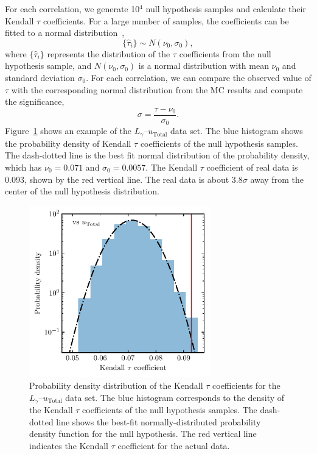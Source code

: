 \documentclass[doublespace,nopageskip]{VTthesis}
\begin{document}
For each correlation, we generate 10$^4$ null hypothesis samples and calculate their Kendall $\tau$ coefficients. For a large number of samples, the coefficients can be fitted to a normal distribution~\citep{10.2307/2669997},
\begin{equation}
    \{\hat{\tau}_i\} \sim N(\nu_0,\sigma_0),
\end{equation}
where $\{\hat{\tau}_i\}$ represents the distribution of the $\tau$ coefficients from the null hypothesis sample, and $N(\nu_0,\sigma_0)$ is a normal distribution with mean $\nu_0$ and standard deviation $\sigma_0$. For each correlation, we can compare the observed value of $\tau$ with the corresponding normal distribution from the MC results and compute the significance,
\begin{equation}
    \sigma = \frac{\tau - \nu_0}{\sigma_0}.
\end{equation}
Figure~\ref{fig:hist} shows an example of the $L_\gamma$--$u_\mathrm{Total}$ data set. The blue histogram shows the probability density of Kendall $\tau$ coefficients of the null hypothesis samples. The dash-dotted line is the best fit normal distribution of the probability density, which has $\nu_0 = 0.071$ and $\sigma_0 = 0.0057$. The Kendall $\tau$ coefficient of real data is 0.093, shown by the red vertical line. The real data is about 3.8$\sigma$ away from the center of the null hypothesis distribution.

\begin{figure}[htb]
    \centering
    \includegraphics[width=0.7\textwidth]{Figures/Globular/hist_urad.pdf}
    \caption{ Probability density distribution of the Kendall $\tau$ coefficients for the $L_\gamma$--$u_\mathrm{Total}$ data set. The blue histogram %
    corresponds to the density of the Kendall $\tau$ coefficients of the null hypothesis samples. The dash-dotted line shows the best-fit normally-distributed probability density function for the null hypothesis. The red vertical line indicates the Kendall $\tau$ coefficient for the %
    actual data.}
    \label{fig:hist}
\end{figure}
\end{document}
